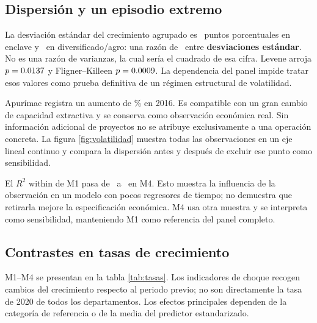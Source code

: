 \FloatBarrier

\subsection{Dispersión y un episodio extremo}
La desviación estándar del crecimiento agrupado es \SdEnclave\ puntos porcentuales en enclave y \SdAgro\ en diversificado/agro: una razón de \SdRatio\ entre \textbf{desviaciones estándar}. No es una razón de varianzas, la cual sería el cuadrado de esa cifra. Levene arroja $p=0.0137$ y Fligner--Killeen $p=0.0009$. La dependencia del panel impide tratar esos valores como prueba definitiva de un régimen estructural de volatilidad.

Apurímac registra un aumento de \ExtremeGrowth\% en 2016. Es compatible con un gran cambio de capacidad extractiva y se conserva como observación económica real. Sin información adicional de proyectos no se atribuye exclusivamente a una operación concreta. La figura \ref{fig:volatilidad} muestra todas las observaciones en un eje lineal continuo y compara la dispersión antes y después de excluir ese punto como sensibilidad.

El $R^2$ within de M1 pasa de \ROne\ a \RFour\ en M4. Esto muestra la influencia de la observación en un modelo con pocos regresores de tiempo; no demuestra que retirarla mejore la especificación económica. M4 usa otra muestra y se interpreta como sensibilidad, manteniendo M1 como referencia del panel completo.

\FloatBarrier

\subsection{Contrastes en tasas de crecimiento}
M1--M4 se presentan en la tabla \ref{tab:tasas}. Los indicadores de choque recogen cambios del crecimiento respecto al periodo previo; no son directamente la tasa de 2020 de todos los departamentos. Los efectos principales dependen de la categoría de referencia o de la media del predictor estandarizado.

